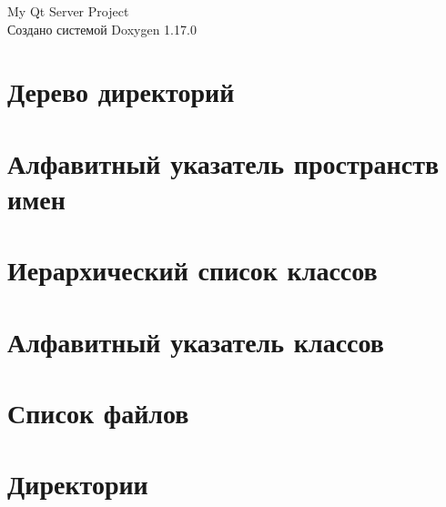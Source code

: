 \documentclass[twoside]{book}
\newcommand{\+}{\discretionary{\mbox{\scriptsize$\hookleftarrow$}}{}{}}
\newcommand{\clearemptydoublepage}{%
    \newpage{\pagestyle{empty}\cleardoublepage}%
  }
\begin{document}
  \raggedbottom
    \hypersetup{pageanchor=false,
                bookmarksnumbered=true,
                pdfencoding=unicode
               }
  \begin{titlepage}
  \vspace*{7cm}
  \begin{center}%
  {\Large My Qt Server Project}\\
  \vspace*{1cm}
  {\large Создано системой Doxygen 1.17.0}\\
  \end{center}
  \end{titlepage}
  \clearemptydoublepage
  \tableofcontents
  \clearemptydoublepage
  \hypersetup{pageanchor=true}
\chapter{Дерево директорий}

\chapter{Алфавитный указатель пространств имен}

\chapter{Иерархический список классов}

\chapter{Алфавитный указатель классов}

\chapter{Список файлов}

\chapter{Директории}











\end{document}
